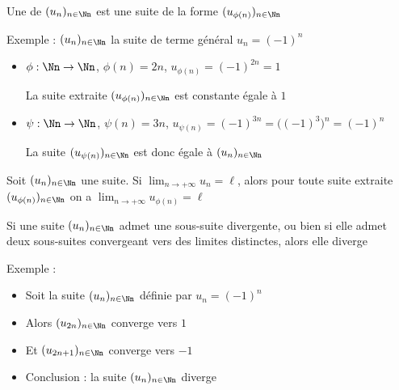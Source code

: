 \begin{frame}

\begin{mydefinition}
Une  de $(u_n)_{n\in \Nn}$ est une suite de la forme 
$(u_{\phi(n)})_{n\in \Nn}$
\end{mydefinition}

\pause

Exemple : $(u_n)_{n\in \Nn}$ la suite de terme général $u_n=(-1)^n$

\pause

\begin{itemize}
  \item $\phi : \Nn \to \Nn$, $\phi(n)=2n$, $u_{\phi(n)}=(-1)^{2n}=1$
 
\pause

La suite extraite $(u_{\phi(n)})_{n\in \Nn}$ est constante égale à $1$

\pause



\pause
  \item $\psi : \Nn \to \Nn$, $\psi(n)=3n$, $u_{\psi(n)}=(-1)^{3n}=\big( (-1)^3\big)^n = (-1)^n$
 
\pause

La suite $(u_{\psi(n)})_{n\in \Nn}$ est donc égale à $(u_n)_{n\in \Nn}$


\end{itemize}




\end{frame}


\begin{frame}

\begin{proposition}
Soit $(u_n)_{n\in \Nn}$ une suite. Si $\lim_{n\to +\infty}u_n=\ell$, alors 
pour toute suite extraite $(u_{\phi(n)})_{n\in \Nn}$ 
on a $\lim_{n\to +\infty} u_{\phi(n)}=\ell$
\end{proposition}

\pause
\bigskip

 Si une suite $(u_n)_{n\in \Nn}$ admet une sous-suite divergente, 
ou bien si elle admet deux sous-suites convergeant vers des 
limites distinctes, alors elle diverge


\pause
\bigskip

Exemple :
\begin{itemize}
  \item Soit la suite $(u_n)_{n\in \Nn}$ définie par $u_n=(-1)^n$
  \item Alors $(u_{2n})_{n\in \Nn}$ converge vers $1$
  \item Et $(u_{2n+1})_{n\in \Nn}$ converge vers $-1$
  \item Conclusion : la suite $(u_n)_{n\in \Nn}$ diverge
\end{itemize}
	
\end{frame}


